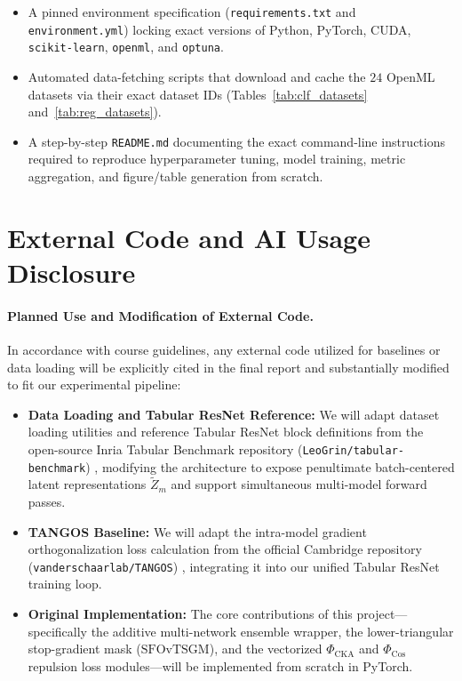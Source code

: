 \documentclass[11pt, a4paper]{article}
\begin{document}
\begin{enumerate}
    \begin{itemize}
        \item A pinned environment specification (\texttt{requirements.txt} and \texttt{environment.yml}) locking exact versions of Python, PyTorch, CUDA, \texttt{scikit-learn}, \texttt{openml}, and \texttt{optuna}.
        \item Automated data-fetching scripts that download and cache the $24$ OpenML datasets via their exact dataset IDs (Tables~\ref{tab:clf_datasets} and~\ref{tab:reg_datasets}).
        \item A step-by-step \texttt{README.md} documenting the exact command-line instructions required to reproduce hyperparameter tuning, model training, metric aggregation, and figure/table generation from scratch.
    \end{itemize}
\end{enumerate}


\section{External Code and AI Usage Disclosure}
\paragraph{Planned Use and Modification of External Code.}
In accordance with course guidelines, any external code utilized for baselines or data loading will be explicitly cited in the final report and substantially modified to fit our experimental pipeline:
\begin{itemize}
    \item \textbf{Data Loading and Tabular ResNet Reference:} We will adapt dataset loading utilities and reference Tabular ResNet block definitions from the open-source Inria Tabular Benchmark repository (\texttt{LeoGrin/tabular-benchmark}) \cite{grinsztajn2022why}, modifying the architecture to expose penultimate batch-centered latent representations $\tilde{Z}_m$ and support simultaneous multi-model forward passes.
    \item \textbf{TANGOS Baseline:} We will adapt the intra-model gradient orthogonalization loss calculation from the official Cambridge repository (\texttt{vanderschaarlab/TANGOS}) \cite{jeffares2023tangos}, integrating it into our unified Tabular ResNet training loop.
    \item \textbf{Original Implementation:} The core contributions of this project—specifically the additive multi-network ensemble wrapper, the lower-triangular stop-gradient mask ($\text{SFOvTSGM}$), and the vectorized $\Phi_{\text{CKA}}$ and $\Phi_{\text{Cos}}$ repulsion loss modules—will be implemented from scratch in PyTorch.
\end{itemize}
\end{document}
